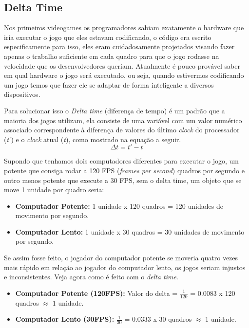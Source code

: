 \subsection{Delta Time}
\label{sec:delta-time}
Nos primeiros videogames os programadores sabiam exatamente o hardware que iria executar o jogo que eles estavam codificando, o código era escrito especificamente para isso, eles eram cuidadosamente projetados visando fazer apenas o trabalho suficiente em cada quadro para que o jogo rodasse na velocidade que os desenvolvedores queriam. Atualmente é pouco provável saber em qual hardware o jogo será executado, ou seja, quando estivermos codificando um jogo temos que fazer ele se adaptar de forma inteligente a diversos dispositivos.

 Para solucionar isso o \textit{Delta time} (diferença de tempo) é um padrão que a maioria dos jogos utilizam, ela consiste de uma variável com um valor numérico associado correspondente à diferença de valores do último \textit{clock} do processador (\textit{t'}) e o \textit{clock} atual (\textit{t}), como mostrado na equação a seguir.
 \begin{equation}
    \Delta t = t' - t
    \label{eq:dt_equation}
\end{equation}

Supondo que tenhamos dois computadores diferentes para executar o jogo, um potente que consiga rodar a 120 FPS (\textit{frames per second}) quadros por segundo e outro menos potente que execute a 30 FPS, sem o delta time, um objeto que se move 1 unidade por quadro seria:
\begin{itemize}
    \item \textbf{Computador Potente:} 1 unidade x 120 quadros = 120 unidades de movimento por segundo.
    \item \textbf{Computador Lento:} 1 unidade x 30 quadros = 30 unidades de movimento por segundo.
\end{itemize}

Se assim fosse feito, o jogador do computador potente se moveria quatro vezes mais rápido em relação ao jogador do computador lento, os jogos seriam injustos e inconsistentes. Veja agora como é feito com o \textit{delta time}.
\begin{itemize}
    \item \textbf{Computador Potente (120FPS):} Valor do delta = \(\frac{1}{120}\) = 0.0083 x 120 quadros \begin{math} \approx\end{math} 1 unidade.
    \item \textbf{Computador Lento (30FPS):} \(\frac{1}{30}\) = 0.0333 x 30 quadros \begin{math} \approx\end{math} 1 unidade.
\end{itemize}

